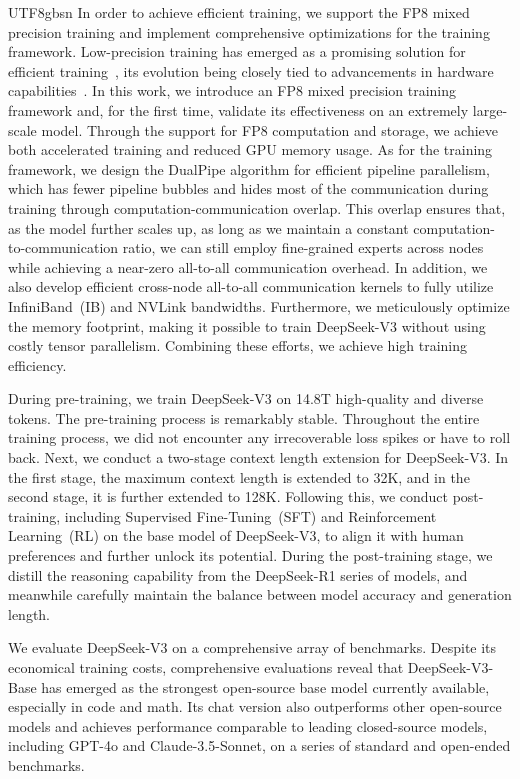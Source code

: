 \documentclass[11pt, a4paper, logo, copyright, nonumbering]{deepseek}
\newcommand{\dsviii}{DeepSeek-V3}
\begin{document}
\begin{CJK*}{UTF8}{gbsn}
In order to achieve efficient training, we support the FP8 mixed precision training and implement comprehensive optimizations for the training framework.
Low-precision training has emerged as a promising solution for efficient training~\citep{bf16train, fp16train, fp8lm, llm.int8}, its evolution being closely tied to advancements in hardware capabilities~\citep{fp8format, hifp8format, microscaling}. 
In this work, we introduce an FP8 mixed precision training framework and, for the first time, validate its effectiveness on an extremely large-scale model. 
Through the support for FP8 computation and storage, we achieve both accelerated training and reduced GPU memory usage. 
As for the training framework, we design the DualPipe algorithm for efficient pipeline parallelism, which has fewer pipeline bubbles and hides most of the communication during training through computation-communication overlap.
This overlap ensures that, as the model further scales up, as long as we maintain a constant computation-to-communication ratio, we can still employ fine-grained experts across nodes while achieving a near-zero all-to-all communication overhead.
In addition, we also develop efficient cross-node all-to-all communication kernels to fully utilize InfiniBand~(IB) and NVLink bandwidths. 
Furthermore, we meticulously optimize the memory footprint, making it possible to train \dsviii{} without using costly tensor parallelism.
Combining these efforts, we achieve high training efficiency. 

During pre-training, we train \dsviii{} on 14.8T high-quality and diverse tokens. 
The pre-training process is remarkably stable. 
Throughout the entire training process, we did not encounter any irrecoverable loss spikes or have to roll back.
Next, we conduct a two-stage context length extension for \dsviii{}. In the first stage, the maximum context length is extended to 32K, and in the second stage, it is further extended to 128K. 
Following this, we conduct post-training, including Supervised Fine-Tuning~(SFT) and Reinforcement Learning~(RL) on the base model of \dsviii{}, to align it with human preferences and further unlock its potential. 
During the post-training stage, we distill the reasoning capability from the DeepSeek-R1 series of models, and meanwhile carefully maintain the balance between model accuracy and generation length. 

We evaluate \dsviii{} on a comprehensive array of benchmarks. 
Despite its economical training costs, comprehensive evaluations reveal that \dsviii{}-Base has emerged as the strongest open-source base model currently available, especially in code and math. 
Its chat version also outperforms other open-source models and achieves performance comparable to leading closed-source models, including GPT-4o and Claude-3.5-Sonnet, on a series of standard and open-ended benchmarks. 


\end{CJK*}
\end{document}
